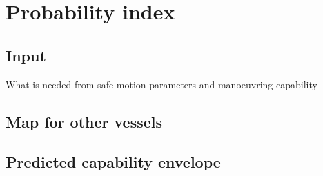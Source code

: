\chapter{Probability index}

\section{Input}
What is needed from safe motion parameters and manoeuvring capability

\section{Map for other vessels}

\section{Predicted capability envelope}
